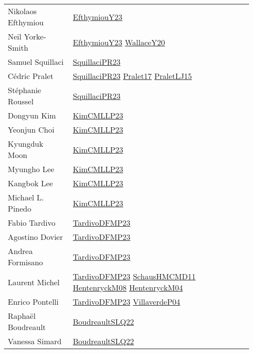 {\begin{longtable}{p{4cm}p{15cm}}
Nikolaos Efthymiou & \href{papers/EfthymiouY23.pdf}{EfthymiouY23}\cite{EfthymiouY23} \\
Neil Yorke{-}Smith & \href{papers/EfthymiouY23.pdf}{EfthymiouY23}\cite{EfthymiouY23} \href{articles/WallaceY20.pdf}{WallaceY20}\cite{WallaceY20} \\
Samuel Squillaci & \href{papers/SquillaciPR23.pdf}{SquillaciPR23}\cite{SquillaciPR23} \\
C{\'{e}}dric Pralet & \href{papers/SquillaciPR23.pdf}{SquillaciPR23}\cite{SquillaciPR23} \href{papers/Pralet17.pdf}{Pralet17}\cite{Pralet17} \href{papers/PraletLJ15.pdf}{PraletLJ15}\cite{PraletLJ15} \\
St{\'{e}}phanie Roussel & \href{papers/SquillaciPR23.pdf}{SquillaciPR23}\cite{SquillaciPR23} \\
Dongyun Kim & \href{papers/KimCMLLP23.pdf}{KimCMLLP23}\cite{KimCMLLP23} \\
Yeonjun Choi & \href{papers/KimCMLLP23.pdf}{KimCMLLP23}\cite{KimCMLLP23} \\
Kyungduk Moon & \href{papers/KimCMLLP23.pdf}{KimCMLLP23}\cite{KimCMLLP23} \\
Myungho Lee & \href{papers/KimCMLLP23.pdf}{KimCMLLP23}\cite{KimCMLLP23} \\
Kangbok Lee & \href{papers/KimCMLLP23.pdf}{KimCMLLP23}\cite{KimCMLLP23} \\
Michael L. Pinedo & \href{papers/KimCMLLP23.pdf}{KimCMLLP23}\cite{KimCMLLP23} \\
Fabio Tardivo & \href{papers/TardivoDFMP23.pdf}{TardivoDFMP23}\cite{TardivoDFMP23} \\
Agostino Dovier & \href{papers/TardivoDFMP23.pdf}{TardivoDFMP23}\cite{TardivoDFMP23} \\
Andrea Formisano & \href{papers/TardivoDFMP23.pdf}{TardivoDFMP23}\cite{TardivoDFMP23} \\
Laurent Michel & \href{papers/TardivoDFMP23.pdf}{TardivoDFMP23}\cite{TardivoDFMP23} \href{articles/SchausHMCMD11.pdf}{SchausHMCMD11}\cite{SchausHMCMD11} \href{papers/HentenryckM08.pdf}{HentenryckM08}\cite{HentenryckM08} \href{papers/HentenryckM04.pdf}{HentenryckM04}\cite{HentenryckM04} \\
Enrico Pontelli & \href{papers/TardivoDFMP23.pdf}{TardivoDFMP23}\cite{TardivoDFMP23} \href{papers/VillaverdeP04.pdf}{VillaverdeP04}\cite{VillaverdeP04} \\
Rapha{\"{e}}l Boudreault & \href{papers/BoudreaultSLQ22.pdf}{BoudreaultSLQ22}\cite{BoudreaultSLQ22} \\
Vanessa Simard & \href{papers/BoudreaultSLQ22.pdf}{BoudreaultSLQ22}\cite{BoudreaultSLQ22} \\

\end{longtable}}
